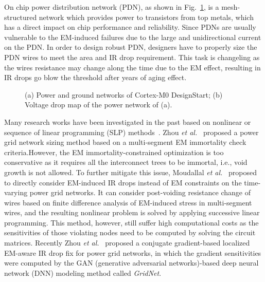 On chip power distribution network (PDN), as shown in Fig.~\ref{fig:pgimage}, is a mesh-structured network which provides power to transistors from top metals,  which has a direct impact on chip performance and reliability. Since PDNs are usually vulnerable to the EM-induced failures due to the large and unidirectional current on the PDN. In order to design robust PDN, designers have to properly size the PDN wires to meet the area and IR drop requirement. This task is changeling as the wires resistance may change along the time due to the EM effect, resulting in IR drops go blow the threshold after years of aging effect.
\begin{figure}[htp]
	\centering
	\caption{(a) Power and ground networks of Cortex-M0 DesignStart; (b) Voltage drop map of the power network of (a).}
	\label{fig:pgimage}
\end{figure}
Many research works have been investigated in the past based on nonlinear or sequence of linear programming (SLP) methods~\cite{ChBr:TCAD'88,DuMa:DAC'89,Tan:DAC'99,Wang:TCAD'05,ZhouSun:TVLSI'19, Sukharev:2019pg,ZhouYu:ASPDAC'20,ZhouJin:ICCAD'20}.  Zhou {\it et al.}~\cite{ZhouSun:TVLSI'19,ZhouChen:Integration'21} proposed a power grid network sizing method based on a multi-segment EM immortality check criteria.However, the EM immortality-constrained optimization is too conservative as it requires all the interconnect trees to be immortal, i.e., void growth is not allowed.  To further mitigate this issue, Moudallal {\it et al.}~\cite{Sukharev:2019pg} proposed to directly consider EM-induced IR drops instead of EM constraints on the time-varying power grid networks. It can consider post-voiding resistance change of wires based on finite difference analysis of EM-induced stress in multi-segment wires, and the resulting nonlinear problem is solved by applying successive linear programming. This method, however, still suffer high computational costs as the sensitivities of those violating nodes need to be computed by solving the circuit matrices. Recently Zhou {\it et al.}~\cite{ZhouJin:ICCAD'20, HanLiu:TCAD'22-23} proposed a conjugate gradient-based localized EM-aware IR drop fix for power grid networks, in which the gradient sensitivities were computed by the GAN (generative adversarial networks)-based deep neural network (DNN) modeling method called {\it GridNet}.

